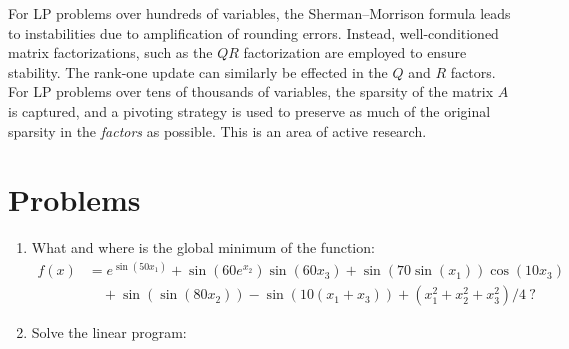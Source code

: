 For LP problems over hundreds of variables, the Sherman--Morrison formula leads to instabilities due to amplification of rounding errors. Instead, well-conditioned matrix factorizations, such as the $QR$ factorization are employed to ensure stability. The rank-one update can similarly be effected in the $Q$ and $R$ factors. For LP problems over tens of thousands of variables, the sparsity of the matrix $A$ is captured, and a pivoting strategy is used to preserve as much of the original sparsity in the {\em factors} as possible. This is an area of active research.

\section{Problems}

\begin{enumerate}

\item What and where is the global minimum of the function:
\begin{align*}
f(x) & = e^{\sin(50x_1)} + \sin(60e^{x_2})\sin(60x_3) + \sin(70\sin(x_1))\cos(10x_3)\\
& \quad + \sin(\sin(80x_2)) - \sin(10(x_1+x_3)) + (x_1^2+x_2^2+x_3^2)/4~?
\end{align*}

\item Solve the linear program:

\end{enumerate}